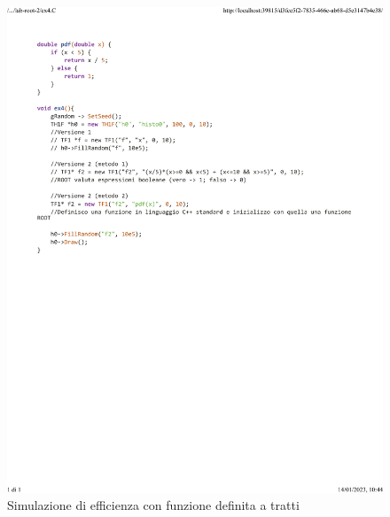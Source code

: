 \documentclass[10pt,a4paper]{article}
\begin{document}
\begin{figure}[h!]
	\centering
	\includegraphics[width=1.\linewidth]{_..._lab-root-2_ex4.C}
	\caption{Simulazione di efficienza con funzione definita a tratti}
\end{figure}
\newpage
\end{document}
